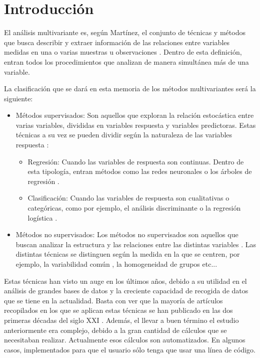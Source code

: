 \chapter*{Introducción}
\noindent El análisis multivariante es, según Martínez, el conjunto de técnicas y métodos que busca describir y extraer información de las relaciones entre variables medidas en una o varias muestras u observaciones \cite{Rosario 1999}. Dentro de esta definición, entran todos los procedimientos que analizan de manera simultánea más de una variable. 

\noindent La clasificación que se dará en esta memoria de los métodos multivariantes será la siguiente:
\begin{itemize}
\item Métodos supervisados: Son aquellos que exploran la relación estocástica entre varias variables, divididas en variables respuesta y variables predictoras. Estas técnicas a su vez se pueden dividir según la naturaleza de las variables respuesta \cite{James 2013}:
\begin{itemize}
\item Regresión:  Cuando las variables de respuesta son continuas. Dentro de esta tipología, entran métodos como las  redes neuronales \cite{Mamidi 2021} o los árboles  de regresión \cite{Nerini 2007}. 
\item Clasificación: Cuando las variables de respuesta son cualitativas o categóricas, como por ejemplo, el análisis discriminante \cite{Diez 2002} o la   regresión logística \cite{Ensum 2005}.
\end{itemize}
\item Métodos no supervisados:  Los métodos no supervisados son aquellos que buscan analizar la estructura y las relaciones entre las distintas variables \cite{Hastie 2001}. Las distintas técnicas se distinguen según la medida en la que se centren, por ejemplo, la variabilidad común \cite{Pages 2005}, la homogeneidad de grupos \cite{Okazaki 2006} etc...
\end{itemize}

\noindent Estas técnicas han visto un auge en los últimos años, debido a su utilidad en el análisis de grandes bases de datos y la creciente capacidad de recogida de datos que se tiene en la actualidad. Basta con ver que la mayoría de artículos recopilados en los que se aplican estas técnicas se han publicado en las dos primeras décadas del siglo XXI \cite{Diaz 2006, Galindo 2015,Diez 2002, Echeverri 2015}. Además, el llevar a buen término el estudio anteriormente era complejo, debido a la gran cantidad de cálculos que se necesitaban realizar. Actualmente esos cálculos son automatizados. En algunos casos, implementados para que el usuario sólo tenga que usar una línea de código.

